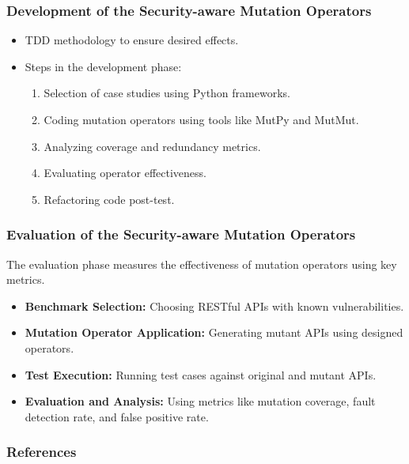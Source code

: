 \documentclass[10pt]{beamer}
\theoremstyle{remark}
\theoremstyle{definition}
\begin{document}
\begin{frame}
    \frametitle{Development of the Security-aware Mutation Operators}
    \begin{itemize}
        \item TDD methodology to ensure desired effects.
        \item Steps in the development phase:
        \begin{enumerate}
            \item Selection of case studies using Python frameworks.
            \item Coding mutation operators using tools like MutPy and MutMut.
            \item Analyzing coverage and redundancy metrics.
            \item Evaluating operator effectiveness.
            \item Refactoring code post-test.
        \end{enumerate}
    \end{itemize}
\end{frame}

\begin{frame}
    \frametitle{Evaluation of the Security-aware Mutation Operators}
    The evaluation phase measures the effectiveness of mutation operators using key metrics.
    \begin{itemize}
        \item \textbf{Benchmark Selection:} Choosing RESTful APIs with known vulnerabilities.
        \item \textbf{Mutation Operator Application:} Generating mutant APIs using designed operators.
        \item \textbf{Test Execution:} Running test cases against original and mutant APIs.
        \item \textbf{Evaluation and Analysis:} Using metrics like mutation coverage, fault detection rate, and false positive rate.
    \end{itemize}
\end{frame}

\begin{frame}[allowframebreaks]
\frametitle{References}
\nocite{*}
\printbibliography
\end{frame}
\end{document}
